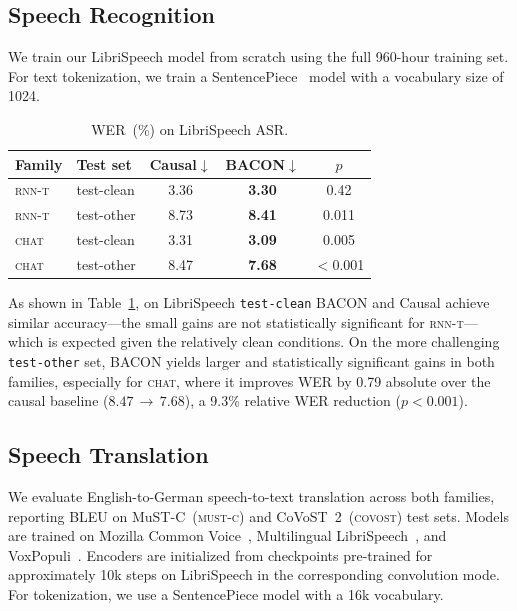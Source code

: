 \documentclass[cameraready]{Interspeech}
\begin{document}
\subsection{Speech Recognition}
\label{subsec:libri}

We train our LibriSpeech model from scratch using the full 960-hour training
set. For text tokenization, we train a SentencePiece~\cite{kudo2018sentencepiece}
model with a vocabulary size of 1024.

\begin{table}[h]
\centering
\caption{WER~(\%) on LibriSpeech ASR.}
\label{tab:libri_wer}
\begin{tabular}{llccc}
\toprule
\textbf{Family} & \textbf{Test set} & \textbf{Causal}$\downarrow$ & \textbf{BACON}$\downarrow$ & $p$ \\
\midrule
\textsc{rnn-t} & test-clean & 3.36 & \textbf{3.30} & 0.42 \\
\textsc{rnn-t} & test-other & 8.73 & \textbf{8.41} & 0.011 \\
\midrule
\textsc{chat} & test-clean & 3.31 & \textbf{3.09} & 0.005 \\
\textsc{chat} & test-other & 8.47 & \textbf{7.68} & $<$0.001 \\
\bottomrule
\end{tabular}
\end{table}


As shown in Table~\ref{tab:libri_wer}, on LibriSpeech \texttt{test-clean} BACON and Causal achieve similar accuracy---the small gains are not statistically significant for \textsc{rnn-t}---which is expected given the relatively clean conditions. 
On the more challenging \texttt{test-other} set, BACON yields larger and statistically significant gains in both families, especially for \textsc{chat}, where it improves WER by 0.79 absolute over the causal baseline ($8.47\,{\rightarrow}\,7.68$), a 9.3\% relative WER reduction ($p<0.001$).

\subsection{Speech Translation}
\label{subsec:ast}

We evaluate English-to-German speech-to-text translation across both families, reporting BLEU on MuST-C~(\textsc{must-c}) and CoVoST~2~(\textsc{covost}) test sets. 
Models are trained on Mozilla Common Voice~\cite{ardila2020common}, Multilingual LibriSpeech~\cite{pratap2020mls}, and VoxPopuli~\cite{wang2021voxpopuli}.
Encoders are initialized from checkpoints pre-trained for approximately 10k steps on LibriSpeech in the corresponding convolution mode. 
For tokenization, we use a SentencePiece model with a 16k vocabulary.
\end{document}

